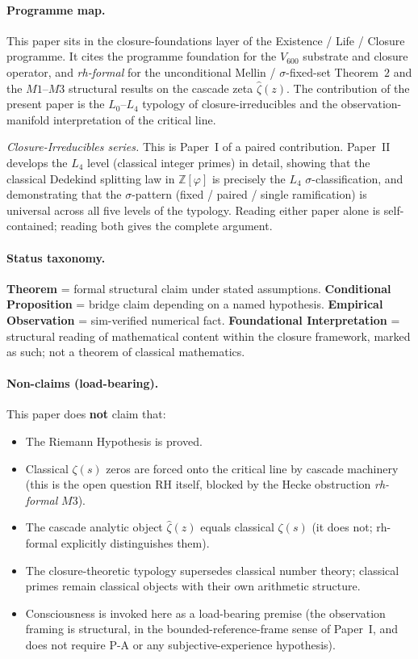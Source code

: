 \documentclass[11pt,a4paper]{article}
\theoremstyle{definition}
\theoremstyle{remark}
\begin{document}
\bigskip

\paragraph{Programme map.}
This paper sits in the closure-foundations layer of the Existence /
Life / Closure programme. It cites the programme foundation
\cite{SmartExistenceClosure} for the $V_{600}$ substrate and closure
operator, and \emph{rh-formal} \cite{rhFormalSmart} for the unconditional
Mellin / $\sigma$-fixed-set Theorem~$2$ and the $M1$--$M3$ structural
results on the cascade zeta $\hat{\zeta}(z)$. The contribution of the
present paper is the $L_0$--$L_4$ typology of closure-irreducibles and
the observation-manifold interpretation of the critical line.

\smallskip
\noindent\emph{Closure-Irreducibles series.} This is Paper~I of a paired
contribution. Paper~II~\cite{ClosurePrimesPaperII} develops the $L_4$
level (classical integer primes) in detail, showing that the
classical Dedekind splitting law in $\mathbb{Z}[\varphi]$ is precisely
the $L_4$ $\sigma$-classification, and demonstrating that the
$\sigma$-pattern (fixed / paired / single ramification) is universal
across all five levels of the typology. Reading either paper alone is
self-contained; reading both gives the complete argument.

\paragraph{Status taxonomy.}
\textbf{Theorem} = formal structural claim under stated assumptions.
\textbf{Conditional Proposition} = bridge claim depending on a named
hypothesis. \textbf{Empirical Observation} = sim-verified numerical
fact. \textbf{Foundational Interpretation} = structural reading of
mathematical content within the closure framework, marked as such; not
a theorem of classical mathematics.

\paragraph{Non-claims (load-bearing).}
This paper does \textbf{not} claim that:
\begin{itemize}\itemsep0pt
  \item The Riemann Hypothesis is proved.
  \item Classical $\zeta(s)$ zeros are forced onto the critical line by cascade machinery (this is the open question RH itself, blocked by the Hecke obstruction \emph{rh-formal} $M3$).
  \item The cascade analytic object $\hat{\zeta}(z)$ equals classical $\zeta(s)$ (it does not; rh-formal explicitly distinguishes them).
  \item The closure-theoretic typology supersedes classical number theory; classical primes remain classical objects with their own arithmetic structure.
  \item Consciousness is invoked here as a load-bearing premise (the observation framing is structural, in the bounded-reference-frame sense of Paper~I, and does not require P-A or any subjective-experience hypothesis).
\end{itemize}
\end{document}
